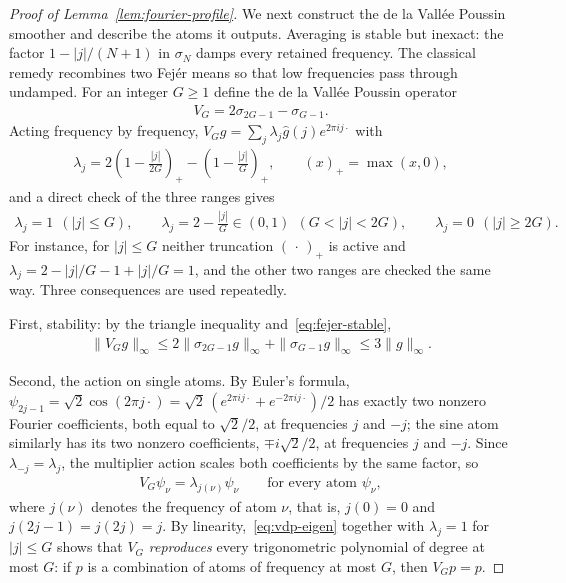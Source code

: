 \begin{proof}[Proof of Lemma~\ref{lem:fourier-profile}]
We next construct the de la Vall\'ee Poussin smoother and describe the atoms it outputs. Averaging is stable but inexact: the factor $1-|j|/(N+1)$ in $\sigma_N$ damps every retained frequency. The classical remedy recombines two Fej\'er means so that low frequencies pass through undamped. For an integer $G\geq1$ define the de la Vall\'ee Poussin operator
\begin{align*}
V_G=2\sigma_{2G-1}-\sigma_{G-1}.
\end{align*}
Acting frequency by frequency, $V_Gg=\sum_j\lambda_j\hat g(j)e^{2\pi ij\cdot}$ with
\begin{align*}
\lambda_j
=2\left(1-\frac{|j|}{2G}\right)_+-\left(1-\frac{|j|}{G}\right)_+,
\qquad(x)_+=\max(x,0),
\end{align*}
and a direct check of the three ranges gives
\begin{align}
\lambda_j=1\ \ (|j|\leq G),
\qquad
\lambda_j=2-\frac{|j|}{G}\in(0,1)\ \ (G<|j|<2G),
\qquad
\lambda_j=0\ \ (|j|\geq2G).
\label{eq:vdp-multipliers}
\end{align}
For instance, for $|j|\leq G$ neither truncation $(\,\cdot\,)_+$ is active and $\lambda_j=2-|j|/G-1+|j|/G=1$, and the other two ranges are checked the same way. Three consequences are used repeatedly.

First, stability: by the triangle inequality and~\eqref{eq:fejer-stable},
\begin{align}
\|V_Gg\|_\infty
\leq2\|\sigma_{2G-1}g\|_\infty+\|\sigma_{G-1}g\|_\infty
\leq3\|g\|_\infty .
\label{eq:vdp-stable}
\end{align}

Second, the action on single atoms. By Euler's formula, $\psi_{2j-1}=\sqrt2\cos(2\pi j\cdot)=\sqrt2\,(e^{2\pi ij\cdot}+e^{-2\pi ij\cdot})/2$ has exactly two nonzero Fourier coefficients, both equal to $\sqrt2/2$, at frequencies $j$ and $-j$; the sine atom similarly has its two nonzero coefficients, $\mp i\sqrt2/2$, at frequencies $j$ and $-j$. Since $\lambda_{-j}=\lambda_j$, the multiplier action scales both coefficients by the same factor, so
\begin{align}
V_G\psi_\nu=\lambda_{j(\nu)}\psi_\nu
\qquad\text{for every atom }\psi_\nu ,
\label{eq:vdp-eigen}
\end{align}
where $j(\nu)$ denotes the frequency of atom $\nu$, that is, $j(0)=0$ and $j(2j-1)=j(2j)=j$. By linearity,~\eqref{eq:vdp-eigen} together with $\lambda_j=1$ for $|j|\leq G$ shows that $V_G$ \emph{reproduces} every trigonometric polynomial of degree at most $G$: if $p$ is a combination of atoms of frequency at most $G$, then $V_Gp=p$.


\end{proof}
